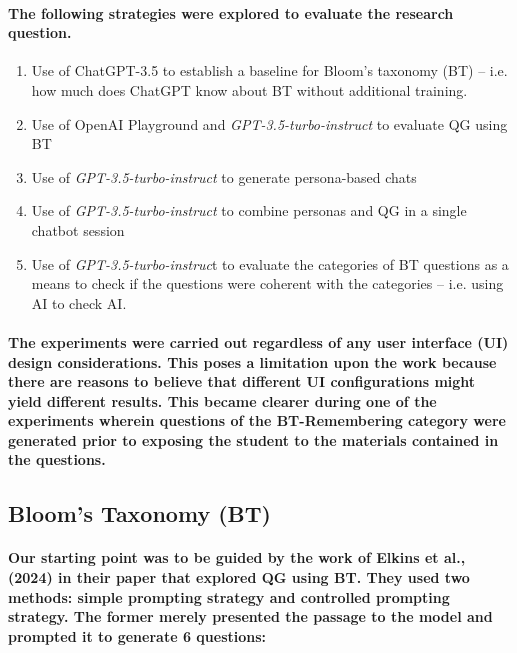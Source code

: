 \documentclass{article}
\begin{document}
\paragraph{The following strategies were explored to evaluate the research question.}

\begin{enumerate}
    \item Use of ChatGPT-3.5 to establish a baseline for Bloom’s taxonomy (BT) – i.e. how much does ChatGPT know about BT without additional training.
    \item Use of OpenAI Playground and \textit{GPT-3.5-turbo-instruct} to evaluate QG using BT
    \item Use of \textit{GPT-3.5-turbo-instruct} to generate persona-based chats
    \item Use of \textit{GPT-3.5-turbo-instruct} to combine personas and QG in a single chatbot session
    \item Use of \textit{GPT-3.5-turbo-instruc}t to evaluate the categories of BT questions as a means to check if the questions were coherent with the categories – i.e. using AI to check AI.
\end{enumerate}

\paragraph{The experiments were carried out regardless of any user interface (UI) design considerations. This poses a limitation upon the work because there are reasons to believe that different UI configurations might yield different results. This became clearer during one of the experiments wherein questions of the BT-Remembering category were generated prior to exposing the student to the materials contained in the questions.}

\newpage

\subsection*{Bloom’s Taxonomy (BT)}

\paragraph{Our starting point was to be guided by the work of Elkins et al., (2024) in their paper that explored QG using BT. They used two methods: simple prompting strategy and controlled prompting strategy. The former merely presented the passage to the model and prompted it to generate 6 questions:}
\end{document}
